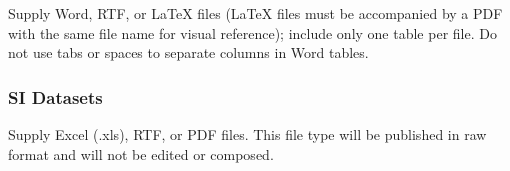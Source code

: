 \documentclass[9pt,twocolumn,twoside]{pnas-new}
\begin{document}
Supply Word, RTF, or LaTeX files (LaTeX files must be accompanied by a PDF with the same file name for visual reference); include only one table per file. Do not use tabs or spaces to separate columns in Word tables.

\subsubsection*{SI Datasets}

Supply Excel (.xls), RTF, or PDF files. This file type will be published in raw format and will not be edited or composed.


\matmethods{
}

\showmatmethods{}%


\showacknow{} %



\end{document}
